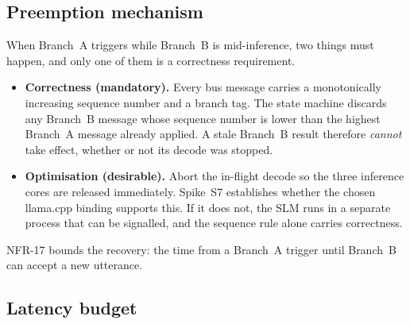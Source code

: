 \documentclass[11pt,a4paper]{article}
\newcommand{\code}[1]{{\ttfamily\small #1}}
\begin{document}
\subsection{Preemption mechanism}

When Branch~A triggers while Branch~B is mid-inference, two things must happen, and only one of them is a
correctness requirement.

\begin{itemize}[leftmargin=1.4em,itemsep=3pt]
  \item \textbf{Correctness (mandatory).} Every bus message carries a monotonically increasing sequence
        number and a \code{branch} tag. The state machine discards any Branch~B message whose sequence
        number is lower than the highest Branch~A message already applied. A stale Branch~B result
        therefore \emph{cannot} take effect, whether or not its decode was stopped.
  \item \textbf{Optimisation (desirable).} Abort the in-flight decode so the three inference cores are
        released immediately. Spike~S7 establishes whether the chosen \code{llama.cpp} binding supports
        this. If it does not, the SLM runs in a separate process that can be signalled, and the sequence
        rule alone carries correctness.
\end{itemize}

NFR-17 bounds the recovery: the time from a Branch~A trigger until Branch~B can accept a new utterance.

\subsection{Latency budget}
\end{document}
